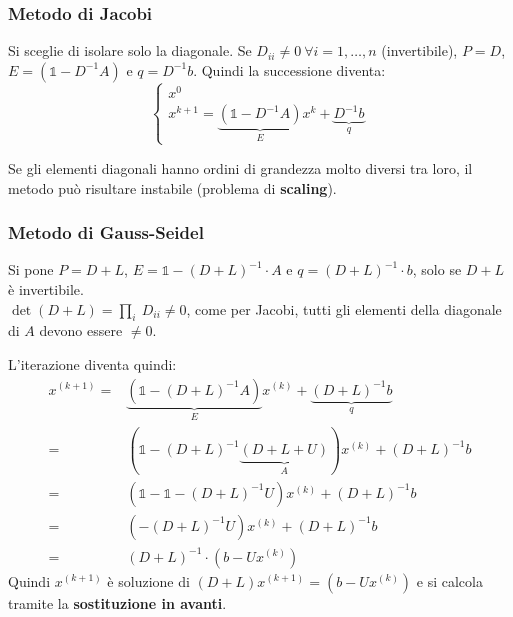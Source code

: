 \documentclass{article}
\begin{document}
\subsubsection{Metodo di Jacobi}
Si sceglie di isolare solo la diagonale. Se $D_{ii}\ne0\ \forall i=1,\dots,n$ (invertibile), $P=D$, $E=\left(\mathbb 1-D^{-1}A\right)$ e $q=D^{-1}b$.
Quindi la successione diventa:\[\begin{cases}
        x^0 \\
        x^{k+1}=\underbrace{\left(\mathbb 1-D^{-1}A\right)}_Ex^k+\underbrace{D^{-1}b}_q
    \end{cases}\]

Se gli elementi diagonali hanno ordini di grandezza molto diversi tra loro, il metodo può risultare instabile (problema di \textbf{scaling}).

\subsubsection{Metodo di Gauss-Seidel}
Si pone $P=D+L$, $E=\mathbb 1-\left(D+L\right)^{-1}\cdot A$ e $q=\left(D+L\right)^{-1}\cdot b$, solo se $D+L$ è invertibile.\\
$\det(D+L) = \prod_{i}\ D_{ii}\neq 0$, come per Jacobi, tutti gli elementi della diagonale di $A$ devono essere $\ne0$.

L'iterazione diventa quindi:
\begin{align*}
    x^{(k+1)}= & \underbrace{\left(\mathbb 1-\left(D+L\right)^{-1}A\right)}_Ex^{(k)}+\underbrace{\left(D+L\right)^{-1}b}_q   \\
    =          & \left(\mathbb 1-\left(D+L\right)^{-1}\underbrace{\left(D+L+U\right)}_A\right)x^{(k)}+\left(D+L\right)^{-1}b \\
    =          & \left(\mathbb 1-\mathbb 1-\left(D+L\right)^{-1}U\right)x^{(k)}+\left(D+L\right)^{-1}b                       \\
    =          & \left(-\left(D+L\right)^{-1}U\right)x^{(k)}+\left(D+L\right)^{-1}b                                          \\
    =          & \left(D+L\right)^{-1}\cdot\left(b-Ux^{(k)}\right)
\end{align*}
Quindi $x^{(k+1)}$ è soluzione di $\left(D+L\right)x^{(k+1)}=\left(b-Ux^{(k)}\right)$ e si calcola tramite la \textbf{sostituzione in avanti}.
\end{document}
